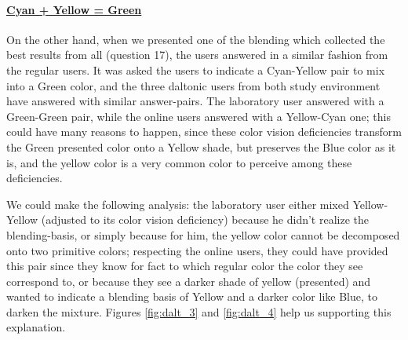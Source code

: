 \paragraph{\ul{Cyan + Yellow = Green}}
%
On the other hand, when we presented one of the blending which collected the best results from all (question 17), the users answered in a similar fashion from the regular users. It was asked the users to indicate a Cyan-Yellow pair to mix into a Green color, and the three daltonic users from both study environment have
answered with similar answer-pairs. The laboratory user answered with a Green-Green pair, while the online users answered with a Yellow-Cyan one; this could have many reasons to happen, since these color vision deficiencies transform the Green presented color onto a Yellow shade, but preserves the Blue color as it is, and
the yellow color is a very common color to perceive among these deficiencies. \par
%
We could make the following analysis: the laboratory user either mixed Yellow-Yellow (adjusted to its color vision deficiency) because he didn't realize the blending-basis, or simply because for him, the yellow color cannot be decomposed onto two primitive colors; respecting the online users, they could have provided this
pair since they know for fact to which regular color the color they see correspond to, or because they see a darker shade of yellow (presented) and wanted to indicate a blending basis of Yellow and a darker color like Blue, to darken the mixture. Figures \ref{fig:dalt_3} and \ref{fig:dalt_4} help us supporting this explanation.
%
